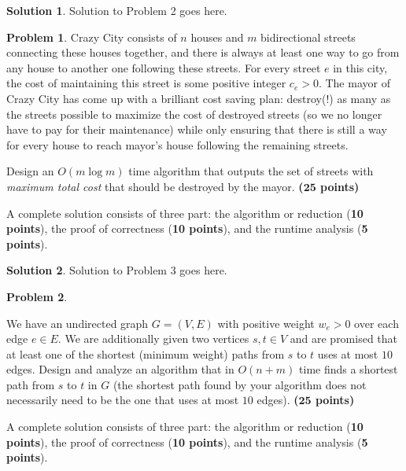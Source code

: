 \documentclass{article}
\theoremstyle{definition}
\newtheorem{problem}{Problem}
\newtheorem*{solution*}{Solution}
\newenvironment{solution}{\begin{solution*}}{{} \end{solution*}}
\newcommand{\grade}[1]{\hfill{\textbf{($\mathbf{#1}$ points)}}}
\begin{document}
\bigskip


\begin{solution}
Solution to Problem 2 goes here. 
\end{solution}

\clearpage

\begin{problem}\label{mst}
	Crazy City consists of $n$ houses and $m$ bidirectional streets connecting these houses together, and there is always at least one way to go from any house to another one following these streets. 
	For every street $e$ in this city, the cost of maintaining this street is some positive integer $c_e > 0$. 
	The mayor of Crazy City has come up with a brilliant cost saving plan: destroy(!) as many as the streets possible to maximize the cost of destroyed streets (so we no longer have to pay for their maintenance) while only ensuring that there is still a way for every house to reach mayor's house following the remaining streets. 
	
	Design an $O(m\log{m})$ time algorithm that outputs the set of streets with \emph{maximum total cost} that should be destroyed by the mayor. \grade{25}

	A complete solution consists of three part: the algorithm or reduction (\textbf{10 points}), the proof of correctness (\textbf{10 points}), 
	and the runtime analysis (\textbf{5 points}). 


	
\end{problem}

\bigskip


\begin{solution}
Solution to Problem 3 goes here. 
\end{solution}

\clearpage
	

\begin{problem}\label{sp}

We have an undirected graph $G=(V,E)$ with positive weight $w_e > 0$ over each edge $e \in E$. We are additionally given two vertices $s,t \in V$ and are promised that at least one of the shortest (minimum weight) paths from $s$ to $t$  uses at most $10$ edges. Design and analyze an algorithm that in $O(n+m)$ time finds a shortest path from $s$ to $t$ in $G$ (the shortest path found by your algorithm does not necessarily need to be the one that uses at most $10$ edges). \grade{25}

A complete solution consists of three part: the algorithm or reduction (\textbf{10 points}), the proof of correctness (\textbf{10 points}), 
and the runtime analysis (\textbf{5 points}). 
\end{problem}
\end{document}
